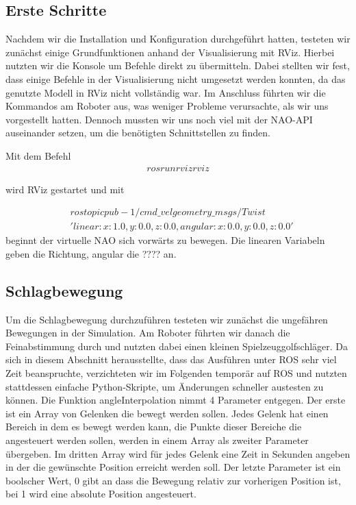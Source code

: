 \documentclass{scrartcl}
\begin{document}
\subsection{Erste Schritte}

Nachdem wir die Installation und Konfiguration durchgeführt hatten, testeten wir zunächst einige Grundfunktionen anhand der Visualisierung mit RViz.
Hierbei nutzten wir die Konsole um Befehle direkt zu übermitteln. Dabei stellten wir fest, dass einige Befehle in der Visualisierung nicht umgesetzt werden konnten, da das genutzte Modell in RViz nicht vollständig war.
Im Anschluss führten wir die Kommandos am Roboter aus, was weniger Probleme verursachte, als wir uns vorgestellt hatten. 
Dennoch mussten wir uns noch viel mit der NAO-API auseinander setzen, um die benötigten Schnittstellen zu finden.

Mit dem Befehl
\begin{align}
rosrun rviz rviz
\end{align}

wird RViz gestartet und mit 

\begin{align}
&rostopic pub -1 /cmd\_vel geometry\_msgs/Twist\\ &'{linear: {x: 1.0, y: 0.0, z: 0.0},angular: {x: 0.0, y: 0.0, z: 0.0}}'
\end{align}
beginnt der virtuelle NAO sich vorwärts zu bewegen. Die linearen Variabeln geben die Richtung, angular die ???? an.

\subsection{Schlagbewegung}

Um die Schlagbewegung durchzuführen testeten wir zunächst die ungefähren Bewegungen in der Simulation. Am Roboter führten wir danach die Feinabstimmung durch und nutzten dabei einen kleinen Spielzeuggolfschläger. 
Da sich in diesem Abschnitt herausstellte, dass das Ausführen unter ROS sehr viel Zeit beanspruchte, verzichteten wir im Folgenden temporär auf ROS und nutzten stattdessen einfache Python-Skripte, um Änderungen schneller austesten zu können.
Die Funktion angleInterpolation nimmt 4 Parameter entgegen. Der erste ist ein Array von Gelenken die bewegt werden sollen. Jedes Gelenk hat einen Bereich in dem es bewegt werden kann, die Punkte dieser Bereiche die angesteuert werden sollen, werden in einem Array als zweiter Parameter übergeben. Im dritten Array wird für jedes Gelenk eine Zeit in Sekunden angeben in der die gewünschte Position erreicht werden soll. Der letzte Parameter ist ein boolscher Wert, 0 gibt an dass die Bewegung relativ zur vorherigen Position ist, bei 1 wird eine absolute Position angesteuert.
\end{document}
